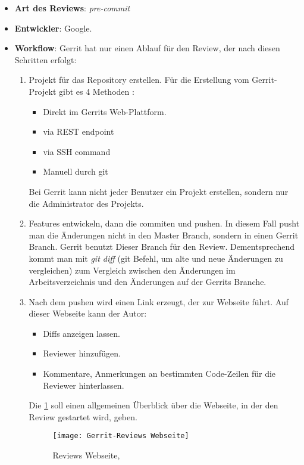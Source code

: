 \begin{itemize}
	\item \textbf{Art des Reviews}: \textit{pre-commit}
	\item \textbf{Entwickler}: Google.
	\item \textbf{Workflow}: Gerrit hat nur einen Ablauf für den Review, der nach diesen Schritten erfolgt:
		\begin{enumerate}
			\item Projekt für das Repository erstellen. Für die Erstellung vom Gerrit-Projekt gibt es 4 Methoden :
			\begin{itemize}
				\item Direkt im Gerrits Web-Plattform.
				\item via REST endpoint
				\item via SSH command
				\item Manuell durch git
			\end{itemize}
			Bei Gerrit kann nicht jeder Benutzer ein Projekt erstellen, sondern nur die Administrator des Projekts.		
			
			\item Features entwickeln, dann die commiten und pushen. In diesem Fall pusht man die Änderungen nicht in den Master Branch, sondern in einen Gerrit Branch.
				Gerrit benutzt Dieser Branch für den Review. Dementsprechend kommt man mit \textit{git diff} (git Befehl, um alte und neue Änderungen zu vergleichen) zum Vergleich
				zwischen den Änderungen im Arbeitsverzeichnis und den Änderungen auf der Gerrits Branche.
			\item Nach dem pushen wird einen Link erzeugt, der zur Webseite führt. Auf dieser Webseite kann der Autor: 
			\begin{itemize}
				\item Diffs anzeigen lassen.
				\item Reviewer hinzufügen.
				\item Kommentare, Anmerkungen an bestimmten Code-Zeilen für die Reviewer hinterlassen.
			\end{itemize}
			Die \cref{fig:Gerrit-Reviews Webseite} soll einen allgemeinen Überblick über die Webseite, in der den Review gestartet wird, geben.
			
			\begin{figure}[H]
				\centering
				\texttt{[image: Gerrit-Reviews Webseite]}
				\caption[Gerrit: Reviews Webseite]{Reviews Webseite,\\ \cite{Gerrit}}
				\label{fig:Gerrit-Reviews Webseite}
			\end{figure}
			

\end{enumerate}
\end{itemize}
